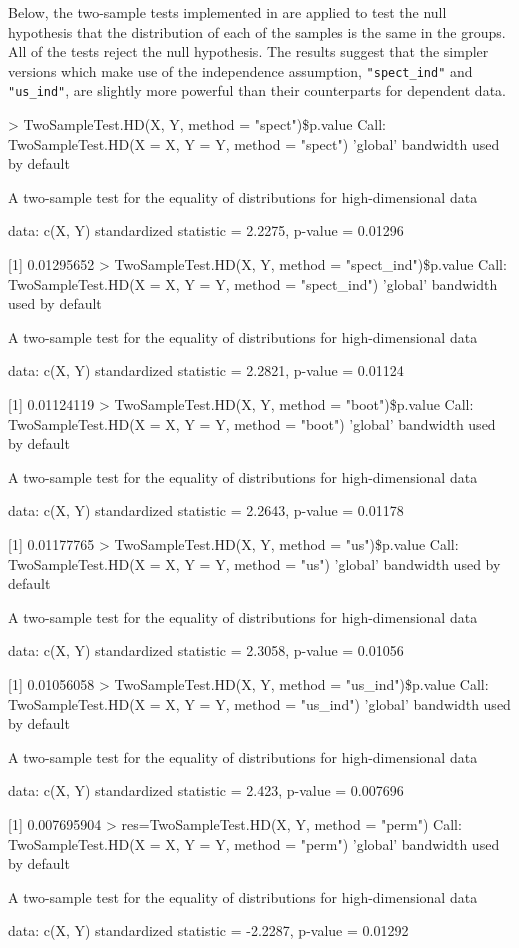 Below, the two-sample tests implemented in  are applied to test the null
hypothesis that the distribution of each of the samples is the same in the groups. All of the tests reject the null hypothesis. The results suggest that the simpler versions which make use of the independence assumption, \texttt{"spect\_ind"} and \texttt{"us\_ind"}, are slightly more powerful than their counterparts for dependent data.

\begin{example}
	> TwoSampleTest.HD(X, Y, method = "spect")\$p.value
	Call: 
	TwoSampleTest.HD(X = X, Y = Y, method = "spect")
	'global' bandwidth used by default
	
	A two-sample test for the equality of distributions for high-dimensional data
	
	data:  c(X, Y)
	standardized statistic = 2.2275, p-value = 0.01296
	
	[1] 0.01295652
	> TwoSampleTest.HD(X, Y, method = "spect_ind")\$p.value
	Call: 
	TwoSampleTest.HD(X = X, Y = Y, method = "spect_ind")
	'global' bandwidth used by default
	
	A two-sample test for the equality of distributions for high-dimensional data
	
	data:  c(X, Y)
	standardized statistic = 2.2821, p-value = 0.01124
	
	[1] 0.01124119
	> TwoSampleTest.HD(X, Y, method = "boot")\$p.value
	Call: 
	TwoSampleTest.HD(X = X, Y = Y, method = "boot")
	'global' bandwidth used by default
	
	A two-sample test for the equality of distributions for high-dimensional data
	
	data:  c(X, Y)
	standardized statistic = 2.2643, p-value = 0.01178
	
	[1] 0.01177765
	> TwoSampleTest.HD(X, Y, method = "us")\$p.value
	Call: 
	TwoSampleTest.HD(X = X, Y = Y, method = "us")
	'global' bandwidth used by default
	
	A two-sample test for the equality of distributions for high-dimensional data
	
	data:  c(X, Y)
	standardized statistic = 2.3058, p-value = 0.01056
	
	[1] 0.01056058
	> TwoSampleTest.HD(X, Y, method = "us_ind")\$p.value
	Call: 
	TwoSampleTest.HD(X = X, Y = Y, method = "us_ind")
	'global' bandwidth used by default
	
	A two-sample test for the equality of distributions for high-dimensional data
	
	data:  c(X, Y)
	standardized statistic = 2.423, p-value = 0.007696
	
	[1] 0.007695904
	> res=TwoSampleTest.HD(X, Y, method = "perm")
	Call: 
	TwoSampleTest.HD(X = X, Y = Y, method = "perm")
	'global' bandwidth used by default
	
	A two-sample test for the equality of distributions for high-dimensional data
	
	data:  c(X, Y)
	standardized statistic = -2.2287, p-value = 0.01292
\end{example}

